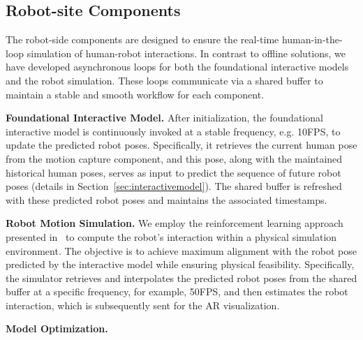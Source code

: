 \subsection{Robot-site Components}
The robot-side components are designed to ensure the real-time human-in-the-loop simulation of human-robot interactions. In contrast to offline solutions, we have developed asynchronous loops for both the foundational interactive models and the robot simulation. These loops communicate via a shared buffer to maintain a stable and smooth workflow for each component. %


\noindent \textbf{Foundational Interactive Model.} After initialization, the foundational interactive model is continuously invoked at a stable frequency, e.g. 10FPS, to update the predicted robot poses. Specifically, it retrieves the current human pose from the motion capture component, and this pose, along with the maintained historical human poses, serves as input to predict the sequence of future robot poses (details in Section~\ref{sec:interactivemodel}). The shared buffer is refreshed with these predicted robot poses and maintains the associated timestamps.

\noindent \textbf{Robot Motion Simulation.} We employ the reinforcement learning approach presented in~\cite{luo2023perpetual} to compute the robot's interaction within a physical simulation environment. The objective is to achieve maximum alignment with the robot pose predicted by the interactive model while ensuring physical feasibility. Specifically, the simulator retrieves and interpolates the predicted robot poses from the shared buffer at a specific frequency, for example, 50FPS, and then estimates the robot interaction, which is subsequently sent for the AR visualization.



\noindent \textbf{Model Optimization.}
